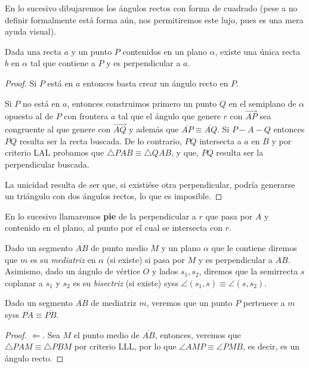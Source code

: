 \documentclass[11pt,a4paper]{book}
\begin{document}
En lo sucesivo dibujaremos los ángulos rectos con forma de cuadrado (pese a no definir formalmente está forma aún, nos permitiremos este lujo, pues es una mera ayuda visual).
\begin{thm}
Dada una recta $a$ y un punto $P$ contenidos en un plano $\alpha$, existe una única recta $b$ en $\alpha$ tal que contiene a $P$ y es perpendicular a $a$.
\end{thm}
\begin{proof}
Si $P$ está en $a$ entonces basta crear un ángulo recto en $P$.

Si $P$ no está en $a$, entonces construimos primero un punto $Q$ en el semiplano de $\alpha$ opuesto al de $P$ con frontera $a$ tal que el ángulo que genere $r$ con $\overrightarrow{AP}$ sea congruente al que genere con $\overrightarrow{AQ}$ y además que $\overline{AP}\equiv\overline{AQ}$. Si $P-A-Q$ entonces $PQ$ resulta ser la recta buscada. De lo contrario, $PQ$ intersecta a $a$ en $B$ y por criterio LAL probamos que $\triangle PAB\equiv\triangle QAB$, y que, $PQ$ resulta ser la perpendicular buscada.

La unicidad resulta de ser que, si existiése otra perpendicular, podría generarse un triángulo con dos ángulos rectos, lo que es imposible.
\end{proof}
En lo sucesivo llamaremos \textbf{pie} de la perpendicular a $r$ que pasa por $A$ y contenido en el plano, al punto por el cual se intersecta con $r$.
\begin{mydef}
	Dado un segmento $\overline{AB}$ de punto medio $M$ y un plano $\alpha$ que le contiene diremos que $m$ es su \textit{mediatriz} en $\alpha$ (si existe) si pasa por $M$ y es perpendicular a $AB$. Asimismo, dado un ángulo de vértice $O$ y lados $s_1,s_2$, diremos que la semirrecta $s$ coplanar a $s_1$ y $s_2$ es su \textit{bisectriz} (si existe) syss $\angle(s_1,s)\equiv\angle(s,s_2)$.
\end{mydef}
\begin{thm}\label{thm:equidistant-points-lie-on-bisector}
	Dado un segmento $\overline{AB}$ de mediatriz $m$, veremos que un punto $P$ pertenece a $m$ syss $\overline{PA}\equiv\overline{PB}$.
\end{thm}
\begin{proof}
	$\Longleftarrow$. Sea $M$ el punto medio de $\overline{AB}$, entonces, veremos que $\triangle PAM\equiv\triangle PBM$ por criterio LLL, por lo que $\angle AMP\equiv\angle PMB$, es decir, es un ángulo recto.
\end{proof}
\end{document}
